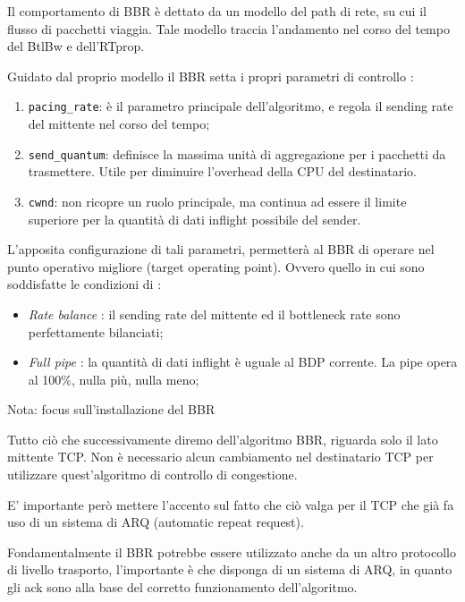 Il comportamento di BBR è dettato da un modello del path di rete, su cui il flusso di pacchetti viaggia. Tale modello traccia l'andamento nel corso del tempo del BtlBw e dell'RTprop. \bigskip

Guidato dal proprio modello il BBR setta i propri parametri di controllo :

\begin{enumerate}

\item \texttt{pacing\_rate}: è il parametro principale dell'algoritmo, e regola il sending rate del mittente nel corso del tempo;

\item \texttt{send\_quantum}: definisce la massima unità di aggregazione per i pacchetti da trasmettere. Utile per diminuire l'overhead della CPU del destinatario.

\item \texttt{cwnd}: non ricopre un ruolo principale, ma continua ad essere il limite superiore per la quantità di dati inflight possibile del sender. 

\end{enumerate}

L'apposita configurazione di tali parametri, permetterà al BBR di operare nel punto operativo migliore (target operating point). Ovvero quello in cui sono soddisfatte le condizioni di :

\begin{itemize}

\item \textit{Rate balance} : il sending rate del mittente ed il bottleneck rate sono perfettamente bilanciati;

\item \textit{Full pipe} : la quantità di dati inflight è uguale al BDP corrente. La pipe opera al 100\%, nulla più, nulla meno;

\end{itemize}

\begin{nota}{Nota: focus sull'installazione del BBR}

Tutto ciò che successivamente diremo dell'algoritmo BBR, riguarda solo il lato mittente TCP. Non è necessario alcun cambiamento nel destinatario TCP per utilizzare quest'algoritmo di controllo di congestione. \bigskip

E' importante però mettere l'accento sul fatto che ciò valga per il TCP che già fa uso di un sistema di ARQ (automatic repeat request). \bigskip

Fondamentalmente il BBR potrebbe essere utilizzato anche da un altro protocollo di livello trasporto, l'importante è che disponga di un sistema di ARQ, in quanto gli ack sono alla base del corretto funzionamento dell'algoritmo.

\end{nota}

